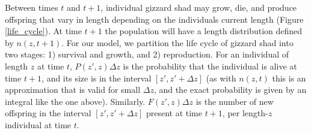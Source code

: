 \documentclass[preprint,review,12pt,authoryear]{elsarticle}
\begin{document}
Between times $t$ and $t+1$, individual gizzard shad may grow, die, and produce offspring that vary in length depending on the individuals current length (Figure \ref{life_cycle}). 
At time $t+1$ the population will have a length distribution defined by $n(z, t+1)$. 
For our model, we partition the life cycle of gizzard shad into two stages: 1) survival and growth, and  2) reproduction. 
For an individual of length $z$ at time $t$, $P(z',z)\Delta z$ is the probability that the individual is alive at time $t+1$, and its size is in the interval $[z', z' + \Delta z]$ (as with $n(z,t)$ this is an approximation that is valid for small $\Delta z$, and the exact probability is given by an integral like the one above). 
Similarly. $F(z',z)\Delta z$ is the number of new offspring in the interval $[z', z' + \Delta z]$ present at time $t+1$, per length-$z$ individual at time $t$.
\end{document}

